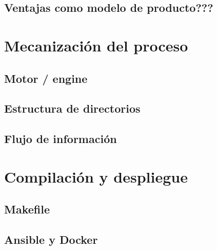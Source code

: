\subsection{Ventajas como modelo de producto???}

\section{Mecanización del proceso}
\subsection{Motor / engine}
\subsection{Estructura de directorios}
\subsection{Flujo de información}

\section{Compilación y despliegue}
\subsection{Makefile}
\subsection{Ansible y Docker}




